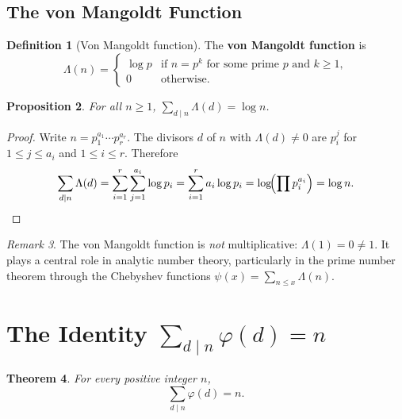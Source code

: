 \documentclass[12pt,a4paper,openany]{book}
\theoremstyle{definition}
\newtheorem{definition}{Definition}[chapter]
\theoremstyle{plain}
\newtheorem{theorem}[definition]{Theorem}
\newtheorem{proposition}[definition]{Proposition}
\theoremstyle{remark}
\newtheorem{remark}[definition]{Remark}
\begin{document}
\subsection{The von Mangoldt Function}\label{subsec:von-mangoldt}

\begin{definition}[Von Mangoldt function]\label{def:von-mangoldt}
The \textbf{von Mangoldt function} is
\[
  \Lambda(n) = \begin{cases}
    \log p & \text{if } n = p^k \text{ for some prime } p \text{ and } k \ge 1,\\
    0      & \text{otherwise.}
  \end{cases}
\]
\end{definition}

\begin{proposition}\label{prop:mangoldt-sum}
For all $n \ge 1$, $\displaystyle\sum_{d \mid n} \Lambda(d) = \log n$.
\end{proposition}

\begin{proof}
Write $n = p_1^{a_1}\cdots p_r^{a_r}$.  The divisors $d$ of $n$ with
$\Lambda(d)\neq 0$ are $p_i^j$ for $1 \le j \le a_i$ and $1 \le i \le r$.
Therefore
\[
  \sum_{d\mid n} \Lambda(d) = \sum_{i=1}^{r} \sum_{j=1}^{a_i} \log p_i
  = \sum_{i=1}^{r} a_i \log p_i = \log\!\Bigl(\prod p_i^{a_i}\Bigr)
  = \log n. \qedhere
\]
\end{proof}

\begin{remark}\label{rem:mangoldt-not-mult}
The von Mangoldt function is \emph{not} multiplicative: $\Lambda(1) = 0 \neq 1$.
It plays a central role in analytic number theory, particularly in the
prime number theorem through the Chebyshev functions
$\psi(x) = \sum_{n\le x}\Lambda(n)$.
\end{remark}

\section{The Identity $\sum_{d \mid n} \varphi(d) = n$}\label{sec:phi-sum}

\begin{theorem}\label{thm:phi-divisor-sum}
For every positive integer $n$,
\[
  \sum_{d \mid n} \varphi(d) = n.
\]
\end{theorem}
\end{document}
